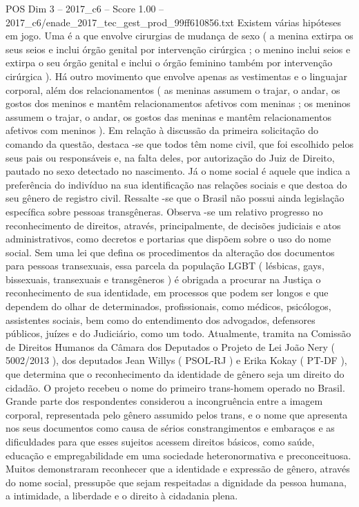 \begin{textsample}{POS Dim 3 – 2017\_c6 – Score 1.00 – 2017\_c6/enade\_2017\_tec\_gest\_prod\_99ff610856.txt}
Existem várias hipóteses em jogo.
Uma é a que envolve cirurgias de mudança de sexo ( a menina extirpa os seus seios e inclui órgão genital por intervenção cirúrgica ; o menino inclui seios e extirpa o seu órgão genital e inclui o órgão feminino também por intervenção cirúrgica ).
Há outro movimento que envolve apenas as vestimentas e o linguajar corporal, além dos relacionamentos ( as meninas assumem o trajar, o andar, os gostos dos meninos e mantêm relacionamentos afetivos com meninas ; os meninos assumem o trajar, o andar, os gostos das meninas e mantêm relacionamentos afetivos com meninos ).
Em relação à discussão da primeira solicitação do comando da questão, destaca -se que todos têm nome civil, que foi escolhido pelos seus pais ou responsáveis e, na falta deles, por autorização do Juiz de Direito, pautado no sexo detectado no nascimento.
Já o nome social é aquele que indica a preferência do indivíduo na sua identificação nas relações sociais e que destoa do seu gênero de registro civil.
Ressalte -se que o Brasil não possui ainda legislação específica sobre pessoas transgêneras.
Observa -se um relativo progresso no reconhecimento de direitos, através, principalmente, de decisões judiciais e atos administrativos, como decretos e portarias que dispõem sobre o uso do nome social.
Sem uma lei que defina os procedimentos da alteração dos documentos para pessoas transexuais, essa parcela da população LGBT ( lésbicas, gays, bissexuais, transexuais e transgêneros ) é obrigada a procurar na Justiça o reconhecimento de sua identidade, em processos que podem ser longos e que dependem do olhar de determinados, profissionais, como médicos, psicólogos, assistentes sociais, bem como do entendimento dos advogados, defensores públicos, juízes e do Judiciário, como um todo.
Atualmente, tramita na Comissão de Direitos Humanos da Câmara dos Deputados o Projeto de Lei João Nery ( 5002/2013 ), dos deputados Jean Willys ( PSOL-RJ ) e Erika Kokay ( PT-DF ), que determina que o reconhecimento da identidade de gênero seja um direito do cidadão.
O projeto recebeu o nome do primeiro trans-homem operado no Brasil.
Grande parte dos respondentes considerou a incongruência entre a imagem corporal, representada pelo gênero assumido pelos trans, e o nome que apresenta nos seus documentos como causa de sérios constrangimentos e embaraços e as dificuldades para que esses sujeitos acessem direitos básicos, como saúde, educação e empregabilidade em uma sociedade heteronormativa e preconceituosa.
Muitos demonstraram reconhecer que a identidade e expressão de gênero, através do nome social, pressupõe que sejam respeitadas a dignidade da pessoa humana, a intimidade, a liberdade e o direito à cidadania plena.

\end{textsample}

